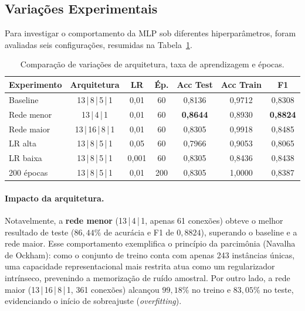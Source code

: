 \documentclass[runningheads]{llncs}
\begin{document}
\subsection{Variações Experimentais}

Para investigar o comportamento da MLP sob diferentes hiperparâmetros,
foram avaliadas seis configurações, resumidas na Tabela~\ref{tab:experiments}.

\begin{table}[H]
\centering
\caption{Comparação de variações de arquitetura, taxa de aprendizagem e épocas.}
\label{tab:experiments}
\begin{tabular}{@{}lcccccc@{}}
\toprule
\textbf{Experimento} & \textbf{Arquitetura} & \textbf{LR} &
\textbf{Ép.} & \textbf{Acc Test} & \textbf{Acc Train} &
\textbf{F1} \\
\midrule
Baseline         & 13\,|\,8\,|\,5\,|\,1   & 0,01  & 60  & 0,8136 & 0,9712 & 0,8308 \\
Rede menor       & 13\,|\,4\,|\,1         & 0,01  & 60  & \textbf{0,8644} & 0,8930 & \textbf{0,8824} \\
Rede maior       & 13\,|\,16\,|\,8\,|\,1  & 0,01  & 60  & 0,8305 & 0,9918 & 0,8485 \\
LR alta          & 13\,|\,8\,|\,5\,|\,1   & 0,05  & 60  & 0,7966 & 0,9053 & 0,8065 \\
LR baixa         & 13\,|\,8\,|\,5\,|\,1   & 0,001 & 60  & 0,8305 & 0,8436 & 0,8438 \\
200 épocas       & 13\,|\,8\,|\,5\,|\,1   & 0,01  & 200 & 0,8305 & 1,0000 & 0,8387 \\
\bottomrule
\end{tabular}
\end{table}

\paragraph{Impacto da arquitetura.}
Notavelmente, a \textbf{rede menor} (13\,|\,4\,|\,1, apenas 61 conexões)
obteve o melhor resultado de teste ($86{,}44\%$ de acurácia e F1 de $0{,}8824$),
superando o baseline e a rede maior. Esse comportamento exemplifica o princípio
da parcimônia (Navalha de Ockham): como o conjunto de treino conta com apenas
243 instâncias únicas, uma capacidade representacional mais restrita atua como
um regularizador intrínseco, prevenindo a memorização de ruído amostral.
Por outro lado, a rede maior (13\,|\,16\,|\,8\,|\,1, 361 conexões) alcançou
$99{,}18\%$ no treino e $83{,}05\%$ no teste, evidenciando o início de
sobreajuste (\textit{overfitting}).
\end{document}
